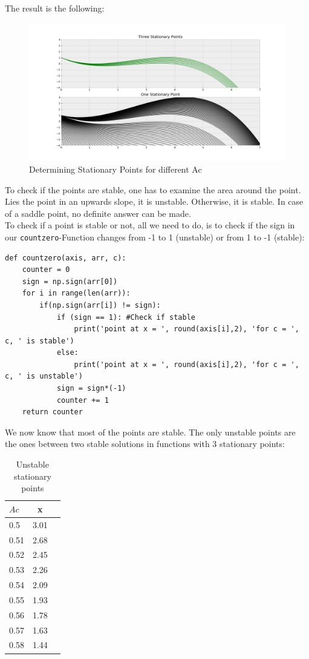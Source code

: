 \documentclass{article}
\begin{document}
The result is the following:
\begin{figure}[H]
\centering
\includegraphics[width=.77\textwidth]{Stationary.png} 
\caption{Determining Stationary Points for different Ac} 
\end{figure}

To check if the points are stable, one has to examine the area around the point.
Lies the point in an upwards slope, it is unstable. Otherwise, it is stable.
In case of a saddle point, no definite answer can be made.\\
To check if a point is stable or not, all we need to do, is to check if the
sign in our \texttt{countzero}-Function changes from -1 to 1 (unstable) or from
1 to -1 (stable):

\begin{lstlisting}
def countzero(axis, arr, c):
    counter = 0
    sign = np.sign(arr[0])
    for i in range(len(arr)):
        if(np.sign(arr[i]) != sign):
            if (sign == 1): #Check if stable
                print('point at x = ', round(axis[i],2), 'for c = ', c, ' is stable')
            else:
                print('point at x = ', round(axis[i],2), 'for c = ', c, ' is unstable')
            sign = sign*(-1)
            counter += 1
    return counter
\end{lstlisting}

We now know that most of the points are stable. The only unstable points are the
ones between two stable solutions in functions with 3 stationary points:

\begin{table}[h]
    \centering
    \begin{tabular}{lcc}
	\toprule 
	\( Ac \) & x \\ \midrule 
	0.5 & 3.01 \\ 
	0.51 & 2.68 \\ 
	0.52 & 2.45 \\ 
	0.53 & 2.26 \\ 
	0.54 & 2.09 \\ 
	0.55 & 1.93 \\ 
	0.56 & 1.78 \\ 
	0.57 & 1.63 \\ 
	0.58 & 1.44 \\ 
	\bottomrule 
    \end{tabular}
    \caption{Unstable stationary points}
\end{table}
\end{document}
